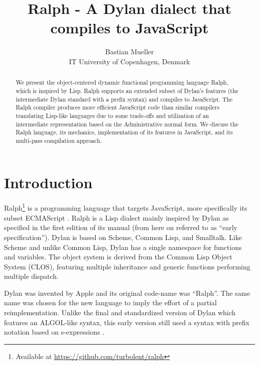 \documentclass{acm_proc_article-sp}
\begin{document}
\title{Ralph - A Dylan dialect that compiles to JavaScript}


\author{
  \alignauthor
  Bastian Mueller\\
  IT University of Copenhagen, Denmark\\
}

\maketitle

\begin{abstract}
We present the object-centered dynamic functional programming language
Ralph, which is inspired by Lisp. Ralph supports an extended subset of
Dylan's features (the intermediate Dylan standard with a prefix
syntax) and compiles to JavaScript. The Ralph compiler produces more
efficient JavaScript code than similar compilers translating Lisp-like
languages due to some trade-offs and utilization of an intermediate
representation based on the Administrative normal form. We discuss the
Ralph language, its mechanics, implementation of its features in
JavaScript, and its multi-pass compilation approach.
\end{abstract}

\section{Introduction}
Ralph\footnote{Available at \url{https://github.com/turbolent/ralph}}
is a programming language that targets JavaScript, more specifically
its subset ECMAScript \cite{ecma262}. Ralph is a Lisp dialect mainly
inspired by Dylan \cite{shalit1996dylan} as specified in the first
edition of its manual \cite{shalit1992dylan} (from here on referred to
as ``early specification''). Dylan is based on Scheme, Common Lisp,
and Smalltalk. Like Scheme and unlike Common Lisp, Dylan has a single
namespace for functions and variables. The object system is derived
from the Common Lisp Object System (CLOS), featuring multiple
inheritance and generic functions performing multiple dispatch.

Dylan was invented by Apple and its original code-name was ``Ralph''.
The same name was chosen for the new language to imply the effort of a
partial reimplementation. Unlike the final and standardized version of
Dylan which features an ALGOL-like syntax, this early version still
used a syntax with prefix notation based on s-expressions
\cite{mccarthy1960}.
\end{document}
